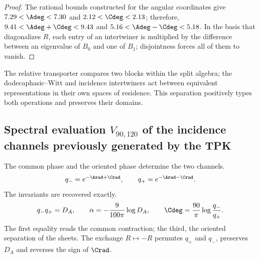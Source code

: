 \begin{proof}
The rational bounds constructed for the angular coordinates give
\(7.29<\Adeg<7.30\) and \(2.12<\Cdeg<2.13\); therefore,
\(9.41<\Adeg+\Cdeg<9.43\) and
\(5.16<\Adeg-\Cdeg<5.18\). In the basis that diagonalizes \(R\), each entry
of an intertwiner is multiplied by the difference between an eigenvalue
of \(B_0\) and one of \(B_1\); disjointness forces all of them to vanish.
\end{proof}

The relative transporter compares two blocks within the split algebra;
the dodecaphasic--Witt and incidence intertwiners act between
equivalent representations in their own spaces of residence. This separation
positively types both operations and preserves their domains.

\subsection{Spectral evaluation \texorpdfstring{\(V_{90,120}\)}{V_90,120} of the incidence channels previously generated by the TPK}
\label{sec:s102:c38:6:3}


The common phase and the oriented phase determine the two channels.
\[
q_-=e^{-\Arad+\Crad},
\qquad
q_+=e^{-\Arad-\Crad}.
\]
The invariants are recovered exactly.
\[
q_-q_+=D_A,
\qquad
\alpha=-\frac9{100\pi}\log D_A,
\qquad
\Cdeg=\frac{90}{\pi}\log\frac{q_-}{q_+}.
\]
The first equality reads the common contraction; the third, the oriented
separation of the sheets. The exchange \(R\mapsto-R\) permutes
\(q_+\) and \(q_-\), preserves \(D_A\) and reverses the sign of \(\Crad\).

\label{sec:l9s102:qpm-posteriores}


